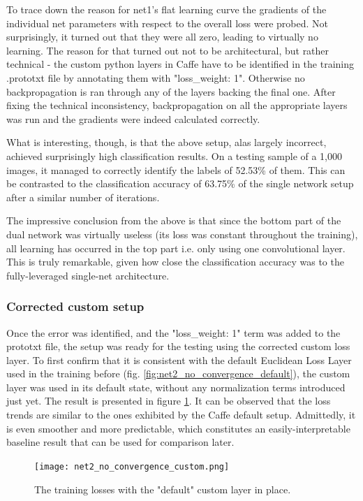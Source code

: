 \documentclass[a4paper, 12pt]{article}
\numberwithin{equation}{section}
\begin{document}
	To trace down the reason for net1's flat learning curve the gradients of the individual net parameters with respect to the overall loss were probed. Not surprisingly, it turned out that they were all zero, leading to virtually no learning. The reason for that turned out not to be architectural, but rather technical - the custom python layers in Caffe have to be identified in the training .prototxt file by annotating them with "loss\_weight: 1". Otherwise no backpropagation is ran through any of the layers backing the final one. After fixing the technical inconsistency, backpropagation on all the appropriate layers was run and the gradients were indeed calculated correctly.

	What is interesting, though, is that the above setup, alas largely incorrect, achieved surprisingly high classification results. On a testing sample of a 1,000 images, it managed to correctly identify the labels of 52.53\% of them. This can be contrasted to the classification accuracy of 63.75\% of the single network setup after a similar number of iterations.

	The impressive conclusion from the above is that since the bottom part of the dual network was virtually useless (its loss was constant throughout the training), all learning has occurred in the top part i.e. only using one convolutional layer. This is truly remarkable, given how close the classification accuracy was to the fully-leveraged single-net architecture.

	\subsubsection{Corrected custom setup}

	Once the error was identified, and the "loss\_weight: 1" term was added to the prototxt file, the setup was ready for the testing using the corrected custom loss layer. To first confirm that it is consistent with the default Euclidean Loss Layer used in the training before (fig. \ref{fig:net2_no_convergence_default}), the custom layer was used in its default state, without any normalization terms introduced just yet. The result is presented in figure \ref{fig:net2_no_convergence_custom}. It can be observed that the loss trends are similar to the ones exhibited by the Caffe default setup. Admittedly, it is even smoother and more predictable, which constitutes an easily-interpretable baseline result that can be used for comparison later.

	\begin{figure}[!ht]
		\centering
		\texttt{[image: net2\_no\_convergence\_custom.png]}
		\caption{\label{fig:net2_no_convergence_custom}{The training losses with the "default" custom layer in place.}}
	\end{figure}
\end{document}
